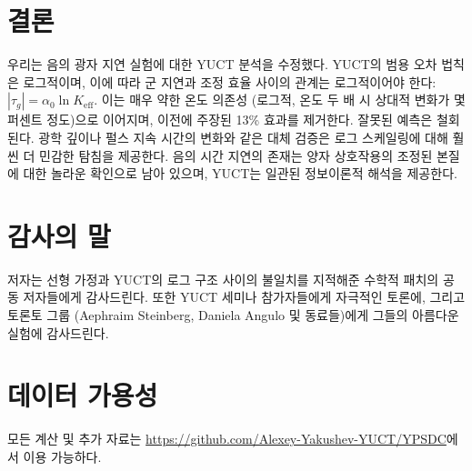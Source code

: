 \documentclass[12pt,a4paper]{article}
\newcommand{\Keff}{K_{\mathrm{eff}}}
\begin{document}
	\section{결론}
	
	우리는 음의 광자 지연 실험에 대한 YUCT 분석을 수정했다. YUCT의 범용 오차 법칙은 로그적이며, 이에 따라 군 지연과 조정 효율 사이의 관계는 로그적이어야 한다: \(|\tau_g| = \alpha_0 \ln\Keff\). 이는 매우 약한 온도 의존성 (로그적, 온도 두 배 시 상대적 변화가 몇 퍼센트 정도)으로 이어지며, 이전에 주장된 13\% 효과를 제거한다. 잘못된 예측은 철회된다. 광학 깊이나 펄스 지속 시간의 변화와 같은 대체 검증은 로그 스케일링에 대해 훨씬 더 민감한 탐침을 제공한다. 음의 시간 지연의 존재는 양자 상호작용의 조정된 본질에 대한 놀라운 확인으로 남아 있으며, YUCT는 일관된 정보이론적 해석을 제공한다.
	
	\section*{감사의 말}
	
	저자는 선형 가정과 YUCT의 로그 구조 사이의 불일치를 지적해준 수학적 패치의 공동 저자들에게 감사드린다. 또한 YUCT 세미나 참가자들에게 자극적인 토론에, 그리고 토론토 그룹 (Aephraim Steinberg, Daniela Angulo 및 동료들)에게 그들의 아름다운 실험에 감사드린다.
	
	\section*{데이터 가용성}
	
	모든 계산 및 추가 자료는 \url{https://github.com/Alexey-Yakushev-YUCT/YPSDC}에서 이용 가능하다.
	
\end{document}
